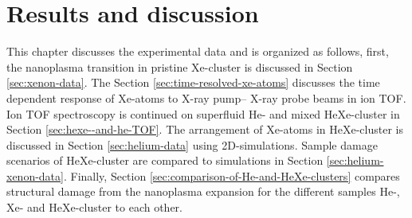 \chapter{Results and discussion}\label{ch:results}
This chapter discusses the experimental data and is organized as follows, first, the nanoplasma transition in pristine Xe-cluster is discussed in Section \ref{sec:xenon-data}. The Section \ref{sec:time-resolved-xe-atoms} discusses the time dependent response of Xe-atoms to X-ray pump-- X-ray probe beams in ion TOF. Ion TOF spectroscopy is continued on superfluid He- and mixed HeXe-cluster in Section \ref{sec:hexe--and-he-TOF}. The arrangement of Xe-atoms in HeXe-cluster is discussed in Section \ref{sec:helium-data} using 2D-simulations. Sample damage scenarios of HeXe-cluster are compared to simulations in Section \ref{sec:helium-xenon-data}. Finally, Section \ref{sec:comparison-of-He-and-HeXe-clusters} compares structural damage from the nanoplasma expansion for the different samples He-, Xe- and HeXe-cluster to each other.
%
%
%
